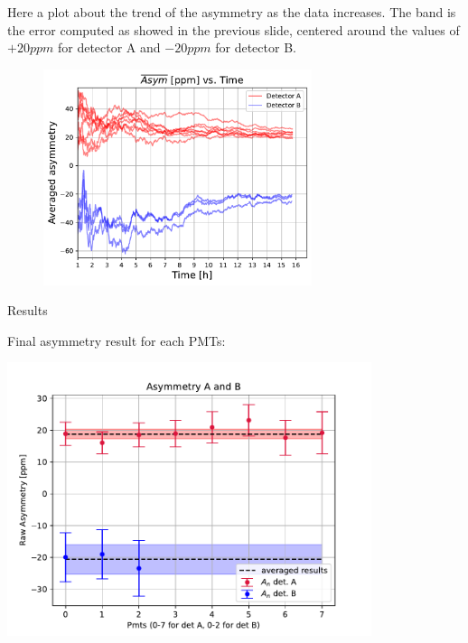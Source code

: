 \documentclass[9pt,a4paper]{beamer}
\newcommand{\commento}[1]{}
\begin{document}
\begin{frame}

Here a plot about the trend of the asymmetry as the data increases. The band is the error computed as showed in the previous slide, centered around the values of $+20ppm$ for detector A and $-20ppm$ for detector B.

\begin{figure}[hbtp]
\centering
\includegraphics[width = 0.70\textwidth]{figures/AveragedAsymmetry.pdf}
\end{figure}

\end{frame}

\commento{
\begin{frame}{Visualization of the Data}

\end{frame}
}

\begin{frame}{Results}

Final asymmetry result for each PMTs:
\begin{center}
\includegraphics[width = 0.80\textwidth]{figures/FirstResult.pdf}
\end{center}

\end{frame}
\end{document}
